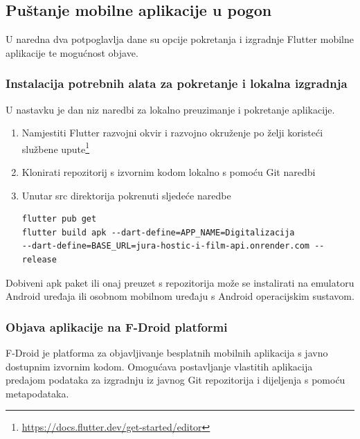 			\subsection{Puštanje mobilne aplikacije u pogon}
			
			{U naredna dva potpoglavlja dane su opcije pokretanja i izgradnje Flutter mobilne aplikacije te mogućnost objave.}
			
			\subsubsection{Instalacija potrebnih alata za pokretanje i lokalna izgradnja}
			
			{U nastavku je dan niz naredbi za lokalno preuzimanje i pokretanje aplikacije.}
			\begin{enumerate}
			\item{Namjestiti Flutter razvojni okvir i razvojno okruženje po želji koristeći službene upute\footnote{\url{https://docs.flutter.dev/get-started/editor}}}
			\item{Klonirati repozitorij s izvornim kodom lokalno s pomoću Git naredbi}
			\item{Unutar src direktorija pokrenuti sljedeće naredbe}
			\begin{verbatim}
flutter pub get
flutter build apk --dart-define=APP_NAME=Digitalizacija 
--dart-define=BASE_URL=jura-hostic-i-film-api.onrender.com --release
			\end{verbatim}
			\end{enumerate}
			
			{Dobiveni apk paket ili onaj preuzet s repozitorija može se instalirati na emulatoru Android uređaja ili osobnom mobilnom uređaju s Android operacijskim sustavom.}
			
			\subsubsection{Objava aplikacije na F-Droid platformi}
			
			{F-Droid je platforma za objavljivanje besplatnih mobilnih aplikacija s javno dostupnim izvornim kodom. Omogućava postavljanje vlastitih aplikacija predajom podataka za izgradnju iz javnog Git repozitorija i dijeljenja s pomoću metapodataka.}
			
